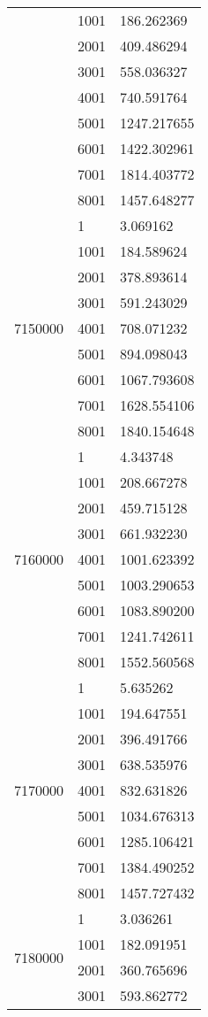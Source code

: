 \begin{table}[htb!]
\begin{tabular}{lll}
 & 1001 & 186.262369 \\
 & 2001 & 409.486294 \\
 & 3001 & 558.036327 \\
 & 4001 & 740.591764 \\
 & 5001 & 1247.217655 \\
 & 6001 & 1422.302961 \\
 & 7001 & 1814.403772 \\
 & 8001 & 1457.648277 \\
\multirow[c]{9}{*}{7150000} & 1 & 3.069162 \\
 & 1001 & 184.589624 \\
 & 2001 & 378.893614 \\
 & 3001 & 591.243029 \\
 & 4001 & 708.071232 \\
 & 5001 & 894.098043 \\
 & 6001 & 1067.793608 \\
 & 7001 & 1628.554106 \\
 & 8001 & 1840.154648 \\
\multirow[c]{9}{*}{7160000} & 1 & 4.343748 \\
 & 1001 & 208.667278 \\
 & 2001 & 459.715128 \\
 & 3001 & 661.932230 \\
 & 4001 & 1001.623392 \\
 & 5001 & 1003.290653 \\
 & 6001 & 1083.890200 \\
 & 7001 & 1241.742611 \\
 & 8001 & 1552.560568 \\
\multirow[c]{9}{*}{7170000} & 1 & 5.635262 \\
 & 1001 & 194.647551 \\
 & 2001 & 396.491766 \\
 & 3001 & 638.535976 \\
 & 4001 & 832.631826 \\
 & 5001 & 1034.676313 \\
 & 6001 & 1285.106421 \\
 & 7001 & 1384.490252 \\
 & 8001 & 1457.727432 \\
\multirow[c]{9}{*}{7180000} & 1 & 3.036261 \\
 & 1001 & 182.091951 \\
 & 2001 & 360.765696 \\
 & 3001 & 593.862772 \\

\end{tabular}
\end{table}

